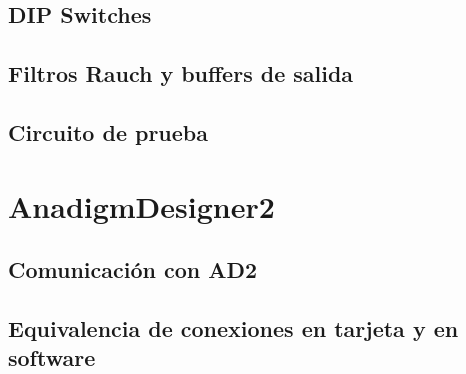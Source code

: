 		\subsection{DIP Switches}
	
		\subsection{Filtros Rauch y buffers de salida}\label{sec:rauch}
	
		\subsection{Circuito de prueba}
		
	\section{AnadigmDesigner2}
	
		\subsection{Comunicación con AD2}\label{sec:comunicacion_con_AD2}

		\subsection{Equivalencia de conexiones en tarjeta y en software}
		
